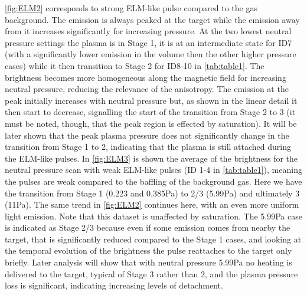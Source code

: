 \autoref{fig:ELM2} corresponds to strong ELM-like pulse compared to the gas background. The emission is always peaked at the target while the emission away from it increases significantly for increasing pressure. At the two lowest neutral pressure settings the plasma is in Stage 1, it is at an intermediate state for ID7 (with a significantly lower emission in the volume then the other higher pressure cases) while it then transition to Stage 2 for ID8-10 in \autoref{tab:table1}. The brightness becomes more homogeneous along the magnetic field for increasing neutral pressure, reducing the relevance of the anisotropy. The emission at the peak initially increases with neutral pressure but, as shown in the linear detail it then start to decrease, signalling the start of the transition from Stage 2 to 3 (it must be noted, though, that the peak region is effected by saturation). It will be later shown that the peak plasma pressure does not significantly change in the transition from Stage 1 to 2, indicating that the plasma is still attached during the ELM-like pulses.
In \autoref{fig:ELM3} is shown the average of the brightness for the neutral pressure scan with weak ELM-like pulses (ID 1-4 in \autoref{tab:table1}), meaning the pulses are weak compared to the baffling of the background gas. Here we have the transition from Stage 1 (0.223 and 0.385Pa) to 2/3 (5.99Pa) and ultimately 3 (11Pa). The same trend in \autoref{fig:ELM2} continues here, with an even more uniform light emission. Note that this dataset is unaffected by saturation. The 5.99Pa case is indicated as Stage 2/3 because even if some emission comes from nearby the target, that is significantly reduced compared to the Stage 1 cases, and looking at the temporal evolution of the brightness the pulse reattaches to the target only briefly. Later analysis will show that with neutral pressure 5.99Pa no heating is delivered to the target, typical of Stage 3 rather than 2, and the plasma pressure loss is significant, indicating increasing levels of detachment.

